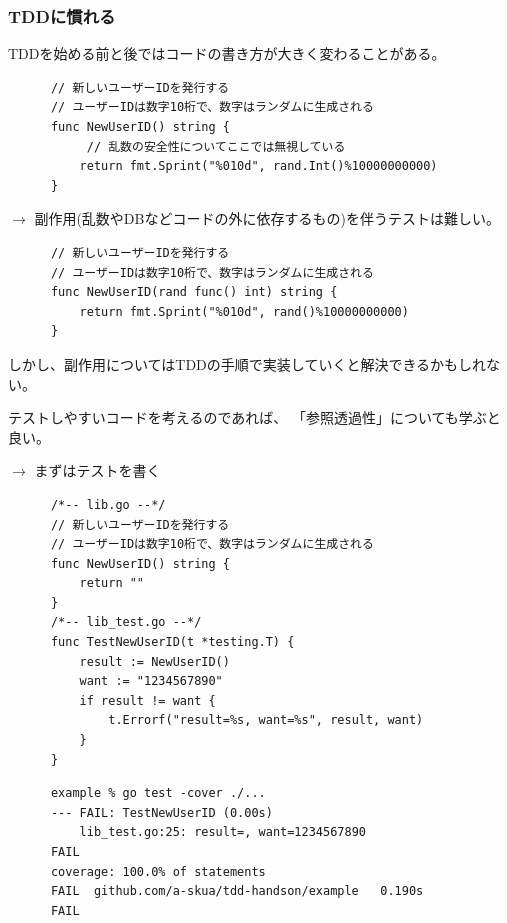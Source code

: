 \documentclass[aspectratio=169]{beamer}
\begin{document}
\begin{frame}[fragile]\frametitle{TDDに慣れる}
  TDDを始める前と後ではコードの書き方が大きく変わることがある。
  {
    \scriptsize
    \begin{verbatim}
      // 新しいユーザーIDを発行する
      // ユーザーIDは数字10桁で、数字はランダムに生成される
      func NewUserID() string {
           // 乱数の安全性についてここでは無視している
          return fmt.Sprint("%010d", rand.Int()%10000000000)
      }
    \end{verbatim}
  }
  $\rightarrow$
  副作用(乱数やDBなどコードの外に依存するもの)を伴うテストは難しい。
  {
    \scriptsize
    \begin{verbatim}
      // 新しいユーザーIDを発行する
      // ユーザーIDは数字10桁で、数字はランダムに生成される
      func NewUserID(rand func() int) string {
          return fmt.Sprint("%010d", rand()%10000000000)
      }
    \end{verbatim}
  }
  しかし、副作用についてはTDDの手順で実装していくと解決できるかもしれない。

  \color{gray}\small
  テストしやすいコードを考えるのであれば、
  「参照透過性」についても学ぶと良い。
\end{frame}

\begin{frame}[fragile]
  $\rightarrow$ まずはテストを書く
  {
    \scriptsize
    \begin{verbatim}
      /*-- lib.go --*/
      // 新しいユーザーIDを発行する
      // ユーザーIDは数字10桁で、数字はランダムに生成される
      func NewUserID() string {
          return ""
      }
      /*-- lib_test.go --*/
      func TestNewUserID(t *testing.T) {
          result := NewUserID()
          want := "1234567890"
          if result != want {
              t.Errorf("result=%s, want=%s", result, want)
          }
      }
    \end{verbatim}
  }
  {
    \color{gray}
    \scriptsize
    \begin{verbatim}
      example % go test -cover ./...   
      --- FAIL: TestNewUserID (0.00s)
          lib_test.go:25: result=, want=1234567890
      FAIL
      coverage: 100.0% of statements
      FAIL	github.com/a-skua/tdd-handson/example	0.190s
      FAIL
    \end{verbatim}
  }
\end{frame}
\end{document}
